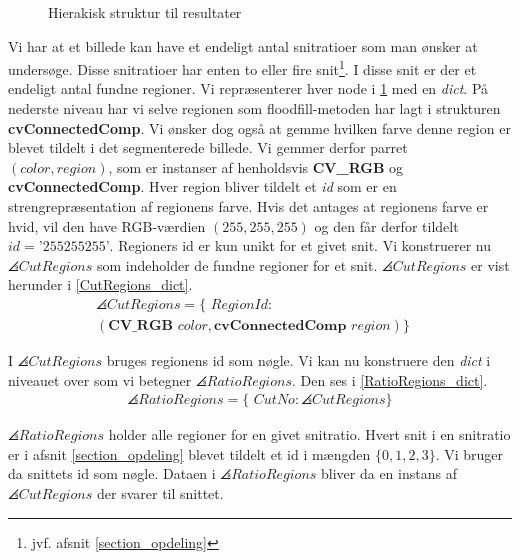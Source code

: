 {\begin{figure}[!h]
    \caption[]{Hierakisk struktur til resultater}
    \label{resultat_hieraki}
\end{figure}

Vi har at et billede kan have et endeligt antal snitratioer som man
ønsker at undersøge. Disse snitratioer har enten to eller fire
snit\footnote{jvf. afsnit \ref{section_opdeling}}. I disse snit er der
et endeligt antal fundne regioner. Vi repræsenterer hver node i
\ref{resultat_hieraki} med en \emph{dict}.  På nederste niveau har vi
selve regionen som floodfill-metoden har lagt i strukturen
\textbf{cvConnectedComp}. Vi ønsker dog også at gemme hvilken farve
denne region er blevet tildelt i det segmenterede billede. Vi gemmer
derfor parret $(color, region)$, som er instanser af henholdsvis
\textbf{CV\_RGB} og \textbf{cvConnectedComp}. Hver region bliver tildelt
et \emph{id} som er en strengrepræsentation af regionens farve.  Hvis
det antages at regionens farve er hvid, vil den have RGB-værdien $(255,
255, 255)$ og den får derfor tildelt $id = \textrm{'255255255'}$.
Regioners id er kun unikt for et givet snit. Vi konstruerer nu
$\angles{CutRegions}$ som indeholder de fundne regioner for et snit.
$\angles{CutRegions}$ er vist herunder i \eqref{CutRegions_dict}.
\begin{multline}
    \angles{CutRegions} = \{ \textit{~RegionId} : \\
    (\textbf{CV\_RGB~}\textit{color}, \textbf{cvConnectedComp~}\textit{region}) \}\quad
    \label{CutRegions_dict}
\end{multline}

\noindent I $\angles{CutRegions}$ bruges regionens id som nøgle. Vi kan nu
konstruere den \emph{dict} i niveauet over som vi betegner
$\angles{RatioRegions}$. Den ses i \eqref{RatioRegions_dict}.
\begin{eqnarray}
    \angles{RatioRegions} = \{ \textit{~CutNo} : \angles{CutRegions} \}
    \label{RatioRegions_dict}
\end{eqnarray}

\noindent $\angles{RatioRegions}$ holder alle regioner for en givet snitratio.
Hvert snit i en snitratio er i afsnit \ref{section_opdeling} blevet
tildelt et id i mængden $\{0,1,2,3\}$. Vi bruger da snittets id som nøgle.
Dataen i $\angles{RatioRegions}$ bliver da en instans af
$\angles{CutRegions}$ der svarer til snittet.

}
